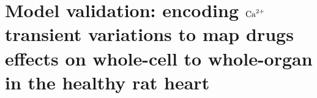 \chapter{Model validation: encoding $\textrm{Ca}^{2+}$ transient variations to map drugs 
effects on whole-cell to whole-organ in the healthy rat 
heart}\label{cha:chapter6}




